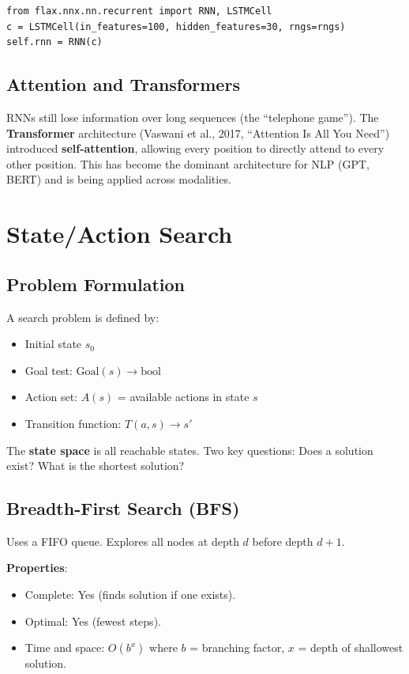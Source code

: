 \documentclass[11pt]{article}
\begin{document}
\begin{lstlisting}
from flax.nnx.nn.recurrent import RNN, LSTMCell
c = LSTMCell(in_features=100, hidden_features=30, rngs=rngs)
self.rnn = RNN(c)
\end{lstlisting}

\subsection{Attention and Transformers}
RNNs still lose information over long sequences (the ``telephone game''). The \textbf{Transformer} architecture (Vaswani et al., 2017, ``Attention Is All You Need'') introduced \textbf{self-attention}, allowing every position to directly attend to every other position. This has become the dominant architecture for NLP (GPT, BERT) and is being applied across modalities.

\section{State/Action Search}

\subsection{Problem Formulation}
A search problem is defined by:
\begin{itemize}
  \item Initial state $s_0$
  \item Goal test: $\text{Goal}(s) \to \text{bool}$
  \item Action set: $A(s)$ = available actions in state $s$
  \item Transition function: $T(a, s) \to s'$
\end{itemize}
The \textbf{state space} is all reachable states. Two key questions: Does a solution exist? What is the shortest solution?

\subsection{Breadth-First Search (BFS)}
Uses a FIFO queue. Explores all nodes at depth $d$ before depth $d+1$.

\textbf{Properties}:
\begin{itemize}
  \item Complete: Yes (finds solution if one exists).
  \item Optimal: Yes (fewest steps).
  \item Time and space: $O(b^x)$ where $b$ = branching factor, $x$ = depth of shallowest solution.
\end{itemize}
\end{document}
